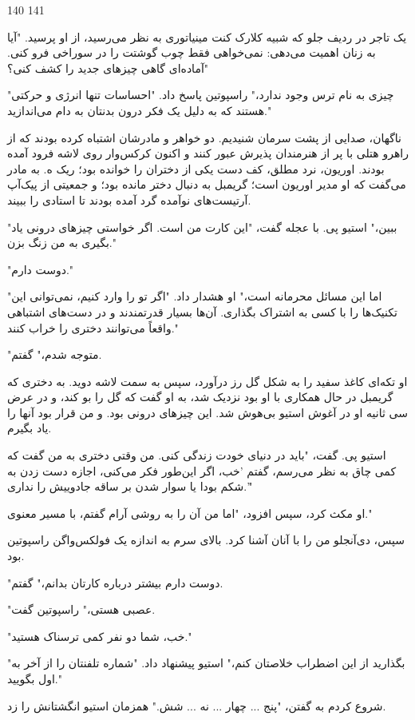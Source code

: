 140
141

یک تاجر در ردیف جلو که شبیه کلارک کنت مینیاتوری به نظر می‌رسید، از او پرسید. "آیا به زنان اهمیت می‌دهی: نمی‌خواهی فقط چوب گوشتت را در سوراخی فرو کنی. آماده‌ای گاهی چیزهای جدید را کشف کنی؟"

"چیزی به نام ترس وجود ندارد،" راسپوتین پاسخ داد. "احساسات تنها انرژی و حرکتی هستند که به دلیل یک فکر درون بدنتان به دام می‌اندازید."

ناگهان، صدایی از پشت سرمان شنیدیم. دو خواهر و مادرشان اشتباه کرده بودند که از راهرو هتلی با پر از هنرمندان پذیرش عبور کنند و اکنون کرکس‌وار روی لاشه فرود آمده بودند. اوریون، نرد مطلق، کف دست یکی از دختران را خوانده بود؛ ریک ه. به مادر می‌گفت که او مدیر اوریون است؛ گریمبل به دنبال دختر مانده بود؛ و جمعیتی از پیک‌آپ آرتیست‌های نوآمده گرد آمده بودند تا استادی را ببیند.

"ببین،" استیو پی. با عجله گفت، "این کارت من است. اگر خواستی چیزهای درونی یاد بگیری به من زنگ بزن."

"دوست دارم."

"اما این مسائل محرمانه است،" او هشدار داد. "اگر تو را وارد کنیم، نمی‌توانی این تکنیک‌ها را با کسی به اشتراک بگذاری. آن‌ها بسیار قدرتمندند و در دست‌های اشتباهی واقعاً می‌توانند دختری را خراب کنند."

"متوجه شدم،" گفتم.

او تکه‌ای کاغذ سفید را به شکل گل رز درآورد، سپس به سمت لاشه دوید. به دختری که گریمبل در حال همکاری با او بود نزدیک شد، به او گفت که گل را بو کند، و در عرض سی ثانیه او در آغوش استیو بی‌هوش شد. این چیزهای درونی بود. و من قرار بود آنها را یاد بگیرم.

استیو پی. گفت، "باید در دنیای خودت زندگی کنی. من وقتی دختری به من گفت که کمی چاق به نظر می‌رسم، گفتم 'خب، اگر این‌طور فکر می‌کنی، اجازه دست زدن به شکم بودا یا سوار شدن بر ساقه جادوییش را نداری.'"

او مکث کرد، سپس افزود، "اما من آن را به روشی آرام گفتم، با مسیر معنوی."

سپس، دی‌آنجلو من را با آنان آشنا کرد. بالای سرم به اندازه یک فولکس‌واگن راسپوتین بود.

"دوست دارم بیشتر درباره کارتان بدانم،" گفتم.

"عصبی هستی،" راسپوتین گفت.

"خب، شما دو نفر کمی ترسناک هستید."

"بگذارید از این اضطراب خلاصتان کنم،" استیو پیشنهاد داد. "شماره تلفنتان را از آخر به اول بگویید."

شروع کردم به گفتن، "پنج ... چهار ... نه ... شش." همزمان استیو انگشتانش را زد.


